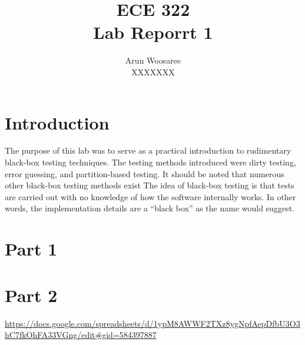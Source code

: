 \documentclass[letterpaper]{article}
\title{ECE 322 \\
Lab Reporrt 1}
\author{Arun Woosaree\\
XXXXXXX}
\begin{document}
 \maketitle 

 \section*{Introduction}
 The purpose of this lab was to serve as a practical introduction to rudimentary black-box testing techniques.
 The testing methods introduced were dirty testing, error guessing, and partition-based testing.
 It should be noted that numerous other black-box testing methods exist
 The idea of black-box testing is that tests are carried out with no knowledge of how the software
 internally works. In other words, the implementation details are a ``black box'' as the name would suggest.
 


\section*{Part 1}

\section*{Part 2}

\appendix
\url{https://docs.google.com/spreadsheets/d/1ypM8AWWF2TXz8ygNpfAepDfbU3O3hC7fkOhFA33VGng/edit#gid=584397887}
\end{document}
